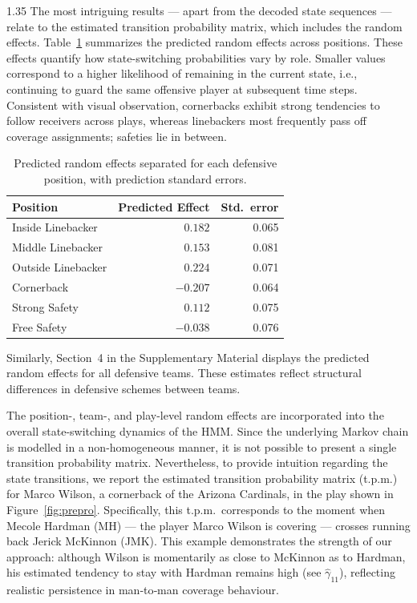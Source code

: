 \documentclass[12pt,a4paper]{article}
\begin{document}
\begin{spacing}{1.35}
The most intriguing results --- apart from the decoded state sequences --- relate to the estimated transition probability matrix, which includes the random effects. Table~\ref{tab:position_effects} summarizes the predicted random effects across positions. These effects quantify how state-switching probabilities vary by role. Smaller values correspond to a higher likelihood of remaining in the current state, i.e., continuing to guard the same offensive player at subsequent time steps. Consistent with visual observation, cornerbacks exhibit strong tendencies to follow receivers across plays, whereas linebackers most frequently pass off coverage assignments; safeties lie in between.

\begin{table}[b!]
\centering
\caption{Predicted random effects separated for each defensive position, with prediction standard errors.}
\label{tab:position_effects}
\begin{tabular}{lrr}
\hline
Position & Predicted Effect & Std.\ error \\
\hline
Inside Linebacker & $\ \ \ 0.182$ & 0.065 \\
Middle Linebacker & $\ \ \ 0.153$ & 0.081 \\
Outside Linebacker & $\ \ \ 0.224$ & 0.071 \\
Cornerback & $-0.207$ & 0.064 \\
Strong Safety & $\ \ \ 0.112$ & 0.075 \\
Free Safety & $-0.038$ & 0.076 \\
\hline
\end{tabular}
\end{table}

Similarly, Section~4 in the Supplementary Material displays the predicted random effects for all defensive teams. These estimates reflect structural differences in defensive schemes between teams. 

The position-, team-, and play-level random effects are incorporated into the overall state-switching dynamics of the HMM. Since the underlying Markov chain is modelled in a non-homogeneous manner, it is not possible to present a single transition probability matrix. Nevertheless, to provide intuition regarding the state transitions, we report the estimated transition probability matrix (t.p.m.) for Marco Wilson, a cornerback of the Arizona Cardinals, in the play shown in Figure~\ref{fig:prepro}. Specifically, this t.p.m.\ corresponds to the moment when Mecole Hardman (MH) --- the player Marco Wilson is covering --- crosses running back Jerick McKinnon (JMK). This example demonstrates the strength of our approach: although Wilson is momentarily as close to McKinnon as to Hardman, his estimated tendency to stay with Hardman remains high (see $\hat{\gamma}_{11}$), reflecting realistic persistence in man‑to‑man coverage behaviour.


\end{spacing}
\end{document}
